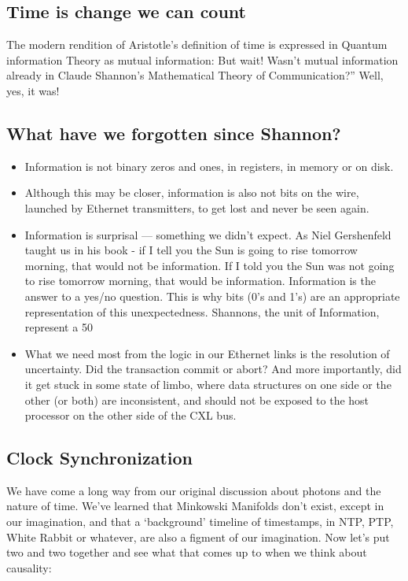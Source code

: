 \documentclass[../../../OAE-SPEC-MAIN.tex]{subfiles}
\begin{document}
\subsection{Time is change we can count}
The modern rendition of Aristotle’s definition of time is expressed in Quantum information Theory as mutual information: But wait! Wasn’t mutual information already in Claude Shannon’s Mathematical Theory of Communication?” Well, yes, it was!

\subsection{What have we  forgotten since Shannon?}
\begin{itemize}
  \item Information is not binary zeros and ones, in registers, in memory or on disk.
  \item Although this may be closer, information is also not bits on the wire, launched by Ethernet transmitters, to get lost and never be seen again.
  \item Information is surprisal — something we didn’t expect. As Niel Gershenfeld taught us in his book - if I tell you the Sun is going to rise tomorrow morning, that would not be information. If I told you the Sun was not going to rise tomorrow morning, that would be information.
Information is the answer to a yes/no question. This is why bits (0’s and 1’s) are an appropriate representation of this unexpectedness. Shannons, the unit of Information, represent a 50%
  \item What we need most from the logic in our Ethernet links is the resolution of uncertainty. Did the transaction commit or abort? And more importantly, did it get stuck in some state of limbo, where data structures on one side or the other (or both) are inconsistent, and should not be exposed to the host processor on the other side of the CXL bus.
\end{itemize}

\subsection{Clock Synchronization}
We have come a long way from our original discussion about photons and the nature of time. We’ve learned that Minkowski Manifolds don’t exist, except in our imagination, and that a ‘background’ timeline of timestamps, in NTP, PTP, White Rabbit or whatever, are also a figment of our imagination. Now let’s put two and two together and see what that comes up to when we think about causality:
\end{document}
